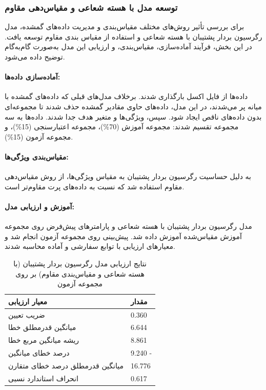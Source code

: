 \subsubsection[مقاوم]{توسعه مدل با هسته شعاعی و مقیاس‌دهی مقاوم}

برای بررسی تأثیر روش‌های مختلف مقیاس‌بندی و مدیریت داده‌های گمشده، مدل رگرسیون بردار پشتیبان با هسته شعاعی و استفاده از مقیاس بندی مقاوم توسعه یافت. در این بخش، فرآیند آماده‌سازی، مقیاس‌بندی، و ارزیابی این مدل به‌صورت گام‌به‌گام توضیح داده می‌شود.

\paragraph{آماده‌سازی داده‌ها:}
داده‌ها از فایل اکسل بارگذاری شدند. برخلاف مدل‌های قبلی که داده‌های گمشده با میانه پر می‌شدند، در این مدل، داده‌های حاوی مقادیر گمشده حذف شدند تا مجموعه‌ای بدون داده‌های ناقص ایجاد شود. سپس، ویژگی‌ها و متغیر هدف جدا شدند. داده‌ها به سه مجموعه تقسیم شدند: مجموعه آموزش (70\%)، مجموعه اعتبارسنجی (15\%)، و مجموعه آزمون (15\%). 

\paragraph{مقیاس‌بندی ویژگی‌ها:}
به دلیل حساسیت رگرسیون بردار پشتیبان به مقیاس ویژگی‌ها، از روش مقیاس‌دهی مقاوم استفاده شد که نسبت به داده‌های پرت مقاوم‌تر است. 

\paragraph{آموزش و ارزیابی مدل:}
مدل رگرسیون بردار پشتیبان با هسته شعاعی و پارامترهای پیش‌فرض روی مجموعه آموزش مقیاس‌شده آموزش داده شد. پیش‌بینی روی مجموعه آزمون انجام شد و معیارهای ارزیابی با توابع سفارشی و آماده محاسبه شدند.

\vspace{0.3cm}
\begin{table}[H]
	\centering
	\caption{نتایج ارزیابی مدل رگرسیون بردار پشتیبان (با هسته شعاعی و مقیاس‌بندی مقاوم) بر روی مجموعه آزمون}
	\renewcommand{\arraystretch}{1.3}
	\begin{tabular}{
			>{\centering\arraybackslash}m{4cm}
			>{\centering\arraybackslash}m{3cm}
		}
		\toprule
		\textbf{معیار ارزیابی} & \textbf{مقدار} \\
		\midrule
		ضریب تعیین & \num{0.360} \\
		میانگین قدرمطلق خطا & \num{6.644} \\
		ریشه میانگین مربع خطا & \num{8.861} \\
		درصد خطای میانگین & \num{9.240} - \\
		میانگین قدرمطلق درصد خطای متقارن & \num{16.776} \\
		انحراف استاندارد نسبی & \num{0.617} \\
		\bottomrule
	\end{tabular}
	\label{tab:svr_robust_rbf}
\end{table}
\vspace{0.5cm}


